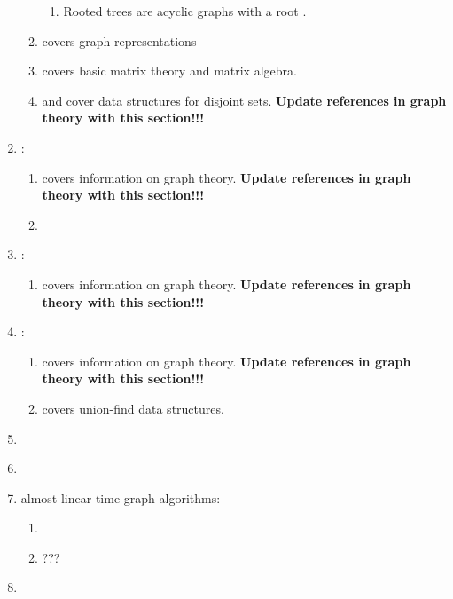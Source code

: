 \begin{enumerate}
\begin{enumerate}
\begin{enumerate}
		\item Rooted trees are acyclic graphs with a root \cite[\S13.1, pp. 598]{Goodrich2011}.
		\end{enumerate}
	\item \cite[\S22.1]{Cormen2009} covers graph representations
	\item \cite[\S D]{Cormen2009} covers basic matrix theory and matrix algebra.
	\item \cite[\S21]{Cormen2009} and \cite[\S14.7]{Goodrich2013} cover data structures for disjoint sets. {\bf Update references in graph theory with this section!!!}
	\end{enumerate}
\item \cite{Cormen2013}: \vspace{-0.3cm}
	\begin{enumerate} \itemsep -2pt
	\item \cite[\S5--\S6]{Cormen2013} covers information on graph theory. {\bf Update references in graph theory with this section!!!}
	\item 
	\end{enumerate}
\item \cite{Goodrich2011}: \vspace{-0.3cm}
	\begin{enumerate} \itemsep -2pt
	\item \cite[\S13.1]{Goodrich2011} covers information on graph theory. {\bf Update references in graph theory with this section!!!}
	\end{enumerate}
\item \cite{Goodrich2013}: \vspace{-0.3cm}
	\begin{enumerate} \itemsep -2pt
	\item \cite[\S14.1]{Goodrich2013} covers information on graph theory. {\bf Update references in graph theory with this section!!!}
	\item \cite[\S14.7.3]{Goodrich2013} covers union-find data structures.
	\end{enumerate}
\item \cite{Gross2014}
\item \cite{Thulasiraman2016}
\item almost linear time graph algorithms: \vspace{-0.3cm}
	\begin{enumerate} \itemsep -2pt
	\item \cite{Bixby1988}
	\item \cite{Chakraborty2018}???
	\end{enumerate}
\item \cite{BangJensen2009}
\end{enumerate}

